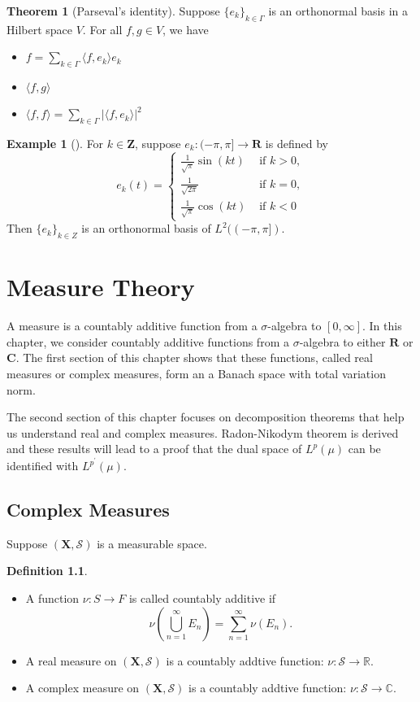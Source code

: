 \documentclass[12pt]{book}
\theoremstyle{definition}
\newtheorem{definition}{Definition}[chapter]
\newtheorem{example}{Example}[chapter]
\newtheorem{theorem}{Theorem}[chapter]
\newcommand{\inner}[2]{{\langle #1,#2\rangle}}
\newcommand{\R}{\mathbb{R}}
\newcommand{\C}{\mathbb{C}}
\newcommand{\X}{\mathbf{X}}
\begin{document}
\begin{theorem}[Parseval's identity]
Suppose $\{e_k\}_{k \in \Gamma}$ is an orthonormal basis in a Hilbert space $V$. For all $f,g\in V$, we have
\begin{itemize}
	\item $f=\sum_{k \in \Gamma}\inner{f}{e_k}e_k$
	\item $\inner{f}{g}$
	\item $\inner{f}{f}= \sum_{k \in \Gamma}|\inner{f}{e_k}|^2$
\end{itemize}
\end{theorem}

\begin{example}[]
For $k \in \mathbf{Z}$, suppose $e_k:(-\pi, \pi] \rightarrow \mathbf{R}$ is defined by
$$
e_k(t)= \begin{cases}\frac{1}{\sqrt{\pi}} \sin (k t) & \text { if } k>0, \\ 
\frac{1}{\sqrt{2 \pi}} & \text { if } k=0, \\ 
\frac{1}{\sqrt{\pi}} \cos (k t) & \text { if } k<0\end{cases}
$$
Then $\{e_k\}_{k \in Z}$ is an orthonormal basis of $L^2((-\pi,\pi])$.
\end{example}





\chapter{Measure Theory} 
A measure is a countably additive function from a $\sigma$-algebra to $[0, \infty] .$ In this chapter, we consider countably additive functions from a $\sigma$-algebra to either $\mathbf{R}$ or $\mathbf{C}$. The first section of this chapter shows that these functions, called real measures or complex measures, form an a Banach space with total variation norm.

The second section of this chapter focuses on decomposition theorems that help us understand real and complex measures. Radon-Nikodym theorem is derived and 
these results will lead to a proof that the dual space of $L^p(\mu)$ can be identified with $L^{p^{\prime}}(\mu)$.
\newpage
\section{Complex Measures}
Suppose $(\X,\mathcal S)$ is a measurable space.
\begin{definition} \ \\
\begin{itemize}
	\item A function $\nu:S \to F$ is called countably additive if \\
	$$
	\nu(\bigcup_{n=1}^\infty E_n) = \sum_{n=1}^{\infty} \nu(E_n).
	$$
	\item A real measure on $(\X,\mathcal S)$ is a countably addtive function: $\nu : \mathcal S \to \R$.
	\item A complex measure on $(\X,\mathcal S)$ is a countably addtive function: $\nu : \mathcal S \to \C$.
\end{itemize}	
\end{definition}
\end{document}
